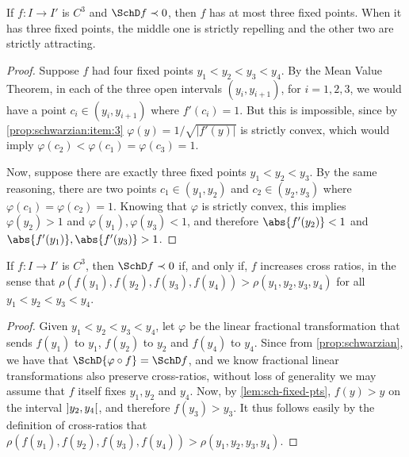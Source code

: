\documentclass[../main]{subfiles}
\begin{document}
\begin{lemma}\label{lem:sch-fixed-pts}
  If \(f \colon I \to I'\) is \(C^3\) and \(\SchD f \prec 0\), then \(f\) has at most three fixed points. When it has three fixed points, the middle one is strictly repelling and the other two are strictly attracting.
\end{lemma}

\begin{proof}
  Suppose \(f\) had four fixed points \(y_1 < y_2 < y_3 < y_4\). By the Mean Value Theorem, in each of the three open intervals \((y_i,y_{i + 1})\), for \(i = 1,2,3\), we would have a point  \(c_i \in (y_i,y_{i + 1})\) where \(f'(c_i) = 1\). But this is impossible, since by \cref{prop:schwarzian:item:3} \(\varphi(y) = 1/ \sqrt{\lvert f'(y) \rvert}\) is strictly convex, which would imply \(\varphi(c_2) < \varphi(c_1) = \varphi(c_3) = 1\).

  Now, suppose there are exactly three fixed points \(y_1 < y_2 < y_3\). By the same reasoning, there are two points \(c_1 \in (y_1,y_2)\) and \(c_2 \in (y_2, y_3)\) where \(\varphi(c_1) = \varphi(c_2) = 1\). Knowing that \(\varphi\) is strictly convex, this implies \(\varphi(y_2) > 1\) and \(\varphi(y_1), \varphi(y_3) < 1\), and therefore \(\abs{f'(y_2)} < 1\) and \(\abs{f'(y_1)},\abs{f'(y_3)} > 1\).
\end{proof}

\begin{lemma}\label{lem:sch-cross-increase}
  If \(f \colon I \to I'\) is \(C^3\), then \(\SchD f \prec 0\) if, and only if, \(f\) increases cross ratios, in the sense that \(\rho(f(y_{1}),f(y_2),f(y_3),f(y_4)) > \rho(y_{1},y_2,y_3,y_4)\) for all \(y_1 < y_2 < y_3 < y_{4}\).
\end{lemma}

\begin{proof}
  Given \(y_1 < y_2 < y_3 < y_{4}\), let \(\varphi\) be the linear fractional transformation that sends \(f(y_1)\) to \(y_1\), \(f(y_2)\) to \(y_2\) and \(f(y_4)\) to \(y_4\). Since from \cref{prop:schwarzian}, we have that \(\SchD{\varphi \circ f} = \SchD f\), and we know fractional linear transformations also preserve cross-ratios, without loss of generality we may assume that \(f\) itself fixes \(y_1,y_2\) and \(y_4\). Now, by \cref{lem:sch-fixed-pts}, \(f(y) > y\) on the interval \(\interval[open]{y_2}{y_4}\), and therefore \(f(y_3) > y_3\). It thus follows easily by the definition of cross-ratios that \(\rho(f(y_{1}),f(y_2),f(y_3),f(y_4)) > \rho(y_{1},y_2,y_3,y_4)\).
\end{proof}
\end{document}
